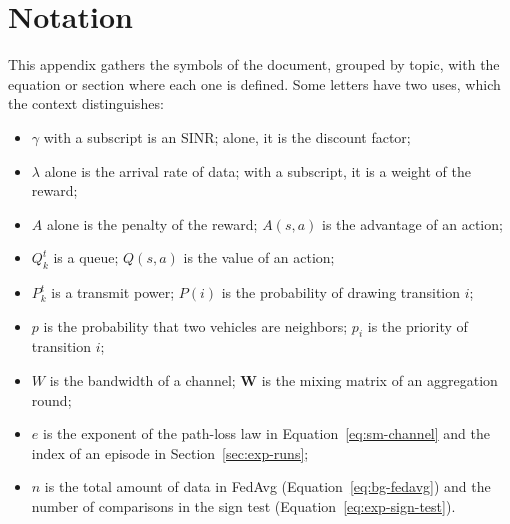 \chapter{Notation}
\label{apx:notation}

This appendix gathers the symbols of the document, grouped by topic, with the equation or section where each
one is defined. Some letters have two uses, which the context distinguishes:
\begin{itemize}[nosep]
  \item $\gamma$ with a subscript is an \acs{SINR}; alone, it is the discount factor;
  \item $\lambda$ alone is the arrival rate of data; with a subscript, it is a weight of the reward;
  \item $A$ alone is the penalty of the reward; $A(s, a)$ is the advantage of an action;
  \item $Q_k^t$ is a queue; $Q(s, a)$ is the value of an action;
  \item $P_k^t$ is a transmit power; $P(i)$ is the probability of drawing transition $i$;
  \item $p$ is the probability that two vehicles are neighbors; $p_i$ is the priority of transition $i$;
  \item $W$ is the bandwidth of a channel; $\bm{W}$ is the mixing matrix of an aggregation round;
  \item $e$ is the exponent of the path-loss law in Equation~\ref{eq:sm-channel} and the index of an episode
    in Section~\ref{sec:exp-runs};
  \item $n$ is the total amount of data in \acs{FedAvg} (Equation~\ref{eq:bg-fedavg}) and the number of
    comparisons in the sign test (Equation~\ref{eq:exp-sign-test}).
\end{itemize}

\newcommand{\notationgroup}[2]{%
  \par\medskip\noindent
  {\footnotesize
  \begin{tabularx}{\linewidth}{@{}>{\raggedright\arraybackslash}p{1.75cm}
      >{\raggedright\arraybackslash}X l@{}}
    \multicolumn{3}{@{}l}{\textbf{#1}} \\
    \toprule
    Symbol & Meaning & Defined in \\
    \midrule
    #2
    \bottomrule
  \end{tabularx}}\par}

